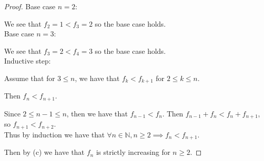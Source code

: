 \documentclass[12 pt]{exam}
\begin{document}
\begin{questions}
\begin{solution}
\begin{proof}
Base case $n = 2$:

We see that $f_2 = 1 < f_3 = 2$ so the base case holds.\\


Base case $n = 3$:

We see that $f_3 = 2 < f_4 = 3$ so the base case holds.\\


Inductive step:

Assume that for $3 \le n$, we have that $f_k < f_{k+1}$ for $2 \le k \le n$.

Then $f_n < f_{n+1}$.

Since $2 \le n-1 \le n$, then we have that $f_{n-1} < f_{n}$. Then $f_{n-1} + f_n < f_n + f_{n+1}$,
so $f_{n+1} < f_{n+2}$.\\

Thus by induction we have that $\forall n \in \mathbb{N}, n \ge 2 \implies f_n < f_{n+1}$.

Then by (c) we have that $f_n$ is strictly increasing for $n \ge 2$.
\end{proof}\end{solution}

 


\end{questions}
\end{document}

